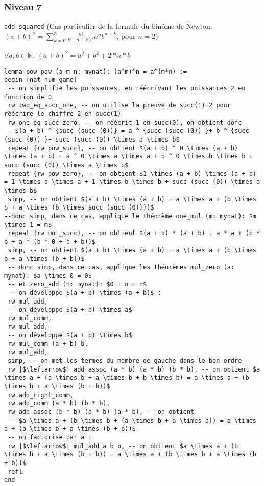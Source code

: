 \subsubsection{Niveau 7} \texttt{add\_squared} (Cas particulier de la formule du binôme de Newton: $(a+b)^n=\sum_{k=0}^{n}{\frac{n!}{k!(n-k)!} a^nb^{n-k}}$, pour $n=2$)
\begin{center} $\forall a, b \in \mathbb{N}$, $(a+b)^2=a^2+b^2+2*a*b $\end{center}
\begin{verbatim}
lemma pow_pow (a m n: mynat): (a^m)^n = a^(m*n) :=
begin [nat_num_game]
 -- on simplifie les puissances, en réécrivant les puissances 2 en fonction de 0 
 rw two_eq_succ_one, -- on utilise la preuve de succ(1)=2 pour réécrire le chiffre 2 en succ(1)
 rw one_eq_succ_zero, -- on réécrit 1 en succ(0), on obtient donc 
 --$(a + b) ^ {succ (succ (0))} = a ^ {succ (succ (0)) }+ b ^ {succ (succ (0)) }+ succ (succ (0)) \times a \times b$
 repeat {rw pow_succ}, -- on obtient $(a + b) ^ 0 \times (a + b) \times (a + b) = a ^ 0 \times a \times a + b ^ 0 \times b \times b + succ (succ (0)) \times a \times b$ 
 repeat {rw pow_zero}, -- on obtient $1 \times (a + b) \times (a + b) = 1 \times a \times a + 1 \times b \times b + succ (succ (0)) \times a \times b$
 simp, -- on obtient $(a + b) \times (a + b) = a \times a + (b \times b + a \times (b \times succ (succ (0))))$
--donc simp, dans ce cas, applique le théorème one_mul (m: mynat): $m \times 1 = m$
 repeat {rw mul_succ}, -- on obtient $(a + b) * (a + b) = a * a + (b * b + a * (b * 0 + b + b))$
 simp, -- on obtient $(a + b) \times (a + b) = a \times a + (b \times b + a \times (b + b))$
 -- donc simp, dans ce cas, applique les théorèmes mul_zero (a: mynat): $a \times 0 = 0$ 
 -- et zero_add (n: mynat): $0 + n = n$
 -- on développe $(a + b) \times (a + b)$ :
 rw mul_add,
 -- on développe $(a + b) \times a$ 
 rw mul_comm,
 rw mul_add,
 -- on développe $(a + b) \times b$ 
 rw mul_comm (a + b) b,
 rw mul_add,
 simp, -- on met les termes du membre de gauche dans le bon ordre 
 rw |$\leftarrow$| add_assoc (a * b) (a * b) (b * b), -- on obtient $a \times a + (a \times b + a \times b + b \times b) = a \times a + (b \times b + a \times (b + b))$
 rw add_right_comm,
 rw add_comm (a * b) (b * b),
 rw add_assoc (b * b) (a * b) (a * b), -- on obtient 
 -- $a \times a + (b \times b + (a \times b + a \times b)) = a \times a + (b \times b + a \times (b + b))$
 -- on factorise par a :
 rw |$\leftarrow$| mul_add a b b, -- on obtient $a \times a + (b \times b + a \times (b + b)) = a \times a + (b \times b + a \times (b + b))$
 refl
end
\end{verbatim}
